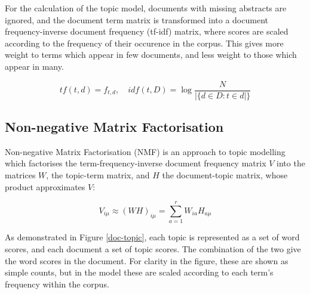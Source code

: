 \documentclass{article}
\begin{document}
\begin{linenumbers}
	For the calculation of the topic model, documents with missing abstracts are ignored, and the document term matrix is transformed into a document
	frequency-inverse document frequency (tf-idf) matrix, where scores are scaled according to the frequency of their occurence in the corpus. This gives more weight to terms which appear in few documents, and less weight to those which appear in many.
	
	\begin{equation}
	tf(t,d) = f_{t,d} \mathrm{,}\quad idf(t,D) = \log\frac{N}{|\{d \in D:t \in d|\}}
	\end{equation} 
	
	\subsection*{Non-negative Matrix Factorisation}
	
	Non-negative Matrix Factorisation (NMF) is an approach to topic modelling which factorises the term-frequency-inverse document frequency matrix \( V \) into the matrices \(W\), the topic-term matrix, and \( H \) the document-topic matrix, whose product approximates \(V\):
	
	\begin{equation}
		V_{i\mu} \approx (WH)_{i\mu} = \sum_{a=1}^{r}W_{ia}H_{a\mu}
	\end{equation}
	
	As demonstrated in Figure \ref{doc-topic}, each topic is represented as a set of word scores, and each document a set of topic scores. The combination of the two give the word scores in the document. For clarity in the figure, these are shown as simple counts, but in the model these are scaled according to each term's frequency within the corpus.
	
%	
%	
	

\end{linenumbers}
\end{document}
